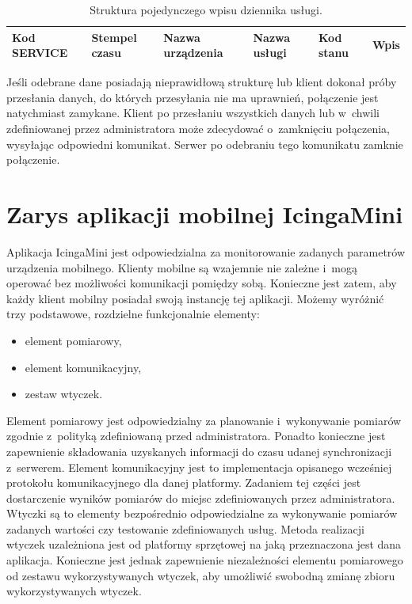 \begin{table}[H]
\centering
\caption{Struktura pojedynczego wpisu dziennika usługi. }
\begin{tabular}{|p{2cm}|p{2cm}|p{3cm}|p{2cm}|p{1cm}|p{2cm}|}
  \hline
  \raggedright{Kod SERVICE} & \raggedright{Stempel czasu} & \raggedright{Nazwa urządzenia} & \raggedright{Nazwa usługi} & \raggedright{Kod stanu} & Wpis  \\
  \hline
\end{tabular}
\end{table}

Jeśli odebrane dane posiadają nieprawidłową strukturę lub klient
dokonał próby przesłania danych, do których przesyłania nie ma
uprawnień, połączenie jest natychmiast zamykane. Klient po przesłaniu
wszystkich danych lub w~chwili zdefiniowanej przez administratora może
zdecydować o~zamknięciu połączenia, wysyłając odpowiedni
komunikat. Serwer po odebraniu tego komunikatu zamknie połączenie.


\section[IcingaMini][Zarys aplikacji mobilnej IcingaMini]{Zarys aplikacji mobilnej IcingaMini}

Aplikacja IcingaMini jest odpowiedzialna za monitorowanie zadanych
parametrów urządzenia mobilnego. Klienty mobilne są wzajemnie nie
zależne i~mogą operować bez możliwości komunikacji pomiędzy
sobą. Konieczne jest zatem, aby każdy klient mobilny posiadał swoją
instancję tej aplikacji. Możemy wyróżnić trzy podstawowe, rozdzielne
funkcjonalnie elementy:

\begin{itemize}
\item element pomiarowy,
\item element komunikacyjny,
\item zestaw wtyczek.
\end{itemize}

Element pomiarowy jest odpowiedzialny za planowanie i~wykonywanie
pomiarów zgodnie z~polityką zdefiniowaną przed administratora. Ponadto
konieczne jest zapewnienie składowania uzyskanych informacji do czasu
udanej synchronizacji z~serwerem. Element komunikacyjny jest to
implementacja opisanego wcześniej protokołu komunikacyjnego dla danej
platformy. Zadaniem tej części jest dostarczenie wyników pomiarów do
miejsc zdefiniowanych przez administratora. Wtyczki są to elementy
bezpośrednio odpowiedzialne za wykonywanie pomiarów zadanych wartości
czy testowanie zdefiniowanych usług. Metoda realizacji wtyczek
uzależniona jest od platformy sprzętowej na jaką przeznaczona jest
dana aplikacja. Konieczne jest jednak zapewnienie niezależności
elementu pomiarowego od zestawu wykorzystywanych wtyczek, aby
umożliwić swobodną zmianę zbioru wykorzystywanych wtyczek.

